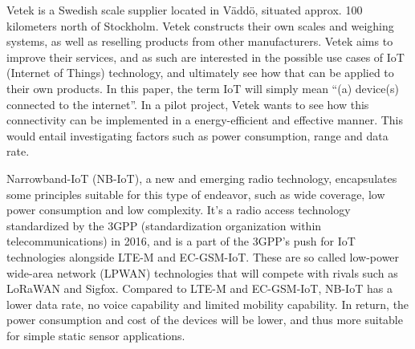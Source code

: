 

Vetek is a Swedish scale supplier located in Väddö, situated approx. 100 kilometers north of Stockholm. Vetek constructs their own scales and weighing systems, as well as reselling products from other manufacturers.\cite{vetek} Vetek aims to improve their services, and as such are interested in the possible use cases of IoT (Internet of Things) technology, and ultimately see how that can be applied to their own products. In this paper, the term IoT will simply mean ``(a) device(s) connected to the internet''\cite{what_is_iot}. In a pilot project, Vetek wants to see how this connectivity can be implemented in a energy-efficient and effective manner. This would entail investigating factors such as power consumption, range and data rate. 


Narrowband-IoT (NB-IoT), a new and emerging radio technology, encapsulates some principles suitable for this type of endeavor, such as wide coverage, low power consumption and low complexity.\cite{NB-overview} It's a radio access technology standardized by the 3GPP (standardization organization within telecommunications)\cite{3gpp} in 2016, and is a part of the 3GPP's push for IoT technologies alongside LTE-M and EC-GSM-IoT. These are so called low-power wide-area network (LPWAN) technologies that will compete with rivals such as LoRaWAN and Sigfox. Compared to LTE-M and EC-GSM-IoT, NB-IoT has a lower  data rate, no voice capability and limited mobility capability. In return, the power consumption and cost of the devices will be lower, and thus more suitable for simple static sensor applications.\cite{sierra-article}

